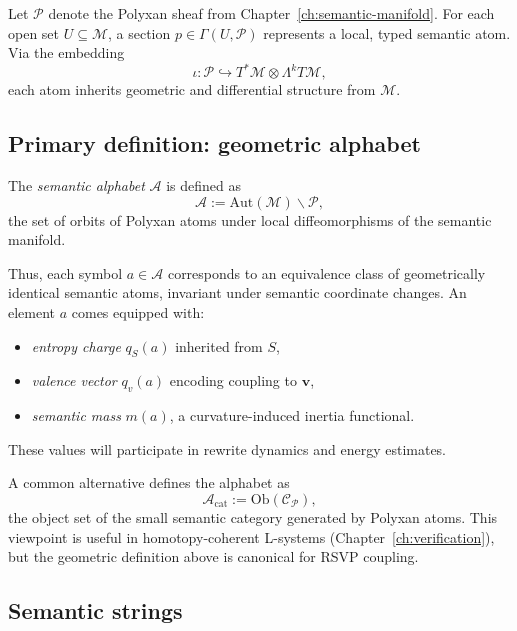 Let $\mathscr{P}$ denote the Polyxan sheaf from Chapter~\ref{ch:semantic-manifold}.
For each open set $U\subseteq\mathcal{M}$,
a section $p\in\Gamma(U,\mathscr{P})$ represents a local, typed semantic atom.
Via the embedding
\[
\iota: \mathscr{P} \hookrightarrow T^*\mathcal{M}\otimes\Lambda^k T\mathcal{M},
\]
each atom inherits geometric and differential structure from $\mathcal{M}$.

\subsection{Primary definition: geometric alphabet}
\label{subsec:alphabet-primary}

\begin{definition}
The \emph{semantic alphabet} $\mathcal{A}$ is defined as
\[
\mathcal{A} := \mathrm{Aut}(\mathcal{M}) \backslash \mathscr{P},
\]
the set of orbits of Polyxan atoms under local diffeomorphisms of the semantic
manifold.
\end{definition}

Thus, each symbol $a\in\mathcal{A}$ corresponds to an equivalence class of
geometrically identical semantic atoms, invariant under semantic coordinate
changes. An element $a$ comes equipped with:
\begin{itemize}
  \item \emph{entropy charge} $q_S(a)$ inherited from $S$,
  \item \emph{valence vector} $q_v(a)$ encoding coupling to $\mathbf{v}$,
  \item \emph{semantic mass} $m(a)$, a curvature-induced inertia functional.
\end{itemize}

These values will participate in rewrite dynamics and energy estimates.

\begin{remark}
A common alternative defines the alphabet as
\[
\mathcal{A}_{\mathrm{cat}} := \mathrm{Ob}(\mathcal{C}_{\mathscr{P}}),
\]
the object set of the small semantic category generated by Polyxan atoms.
This viewpoint is useful in homotopy-coherent L-systems (Chapter~\ref{ch:verification}),
but the geometric definition above is canonical for RSVP coupling.
\end{remark}

\subsection{Semantic strings}

